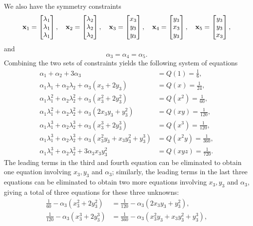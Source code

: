 \documentclass{homework}
\begin{document}
\begin{alphaparts}
		We also have the symmetry constraints
		\begin{equation*}
			\mathbf{x}_1 = \left[\begin{matrix}\lambda_1 \\\lambda_1\\\lambda_1\end{matrix}\right], \quad \mathbf{x}_2 = \left[\begin{matrix}\lambda_2\\\lambda_2\\\lambda_2\end{matrix}\right], \quad \mathbf{x}_3 = \left[\begin{matrix}x_3 \\ y_3 \\ y_3\end{matrix}\right], \quad \mathbf{x}_4 = \left[\begin{matrix}y_3\\x_3\\y_3\end{matrix}\right], \quad \mathbf{x}_5 = \left[\begin{matrix}y_3\\y_3\\x_3\end{matrix}\right],
		\end{equation*}
		and
		\begin{equation*}
			\alpha_3 = \alpha_4=\alpha_5.
		\end{equation*}
		Combining the two sets of constraints yields the following system of equations
		\begin{align*}
			\alpha_1 + \alpha_2 + 3\alpha_3 &= Q(1) = \frac{1}{6},\\
			\alpha_1\lambda_1 + \alpha_2\lambda_2 + \alpha_3(x_3 + 2y_3) &= Q(x) = \frac{1}{24}, \\
			\alpha_1\lambda_1^2 + \alpha_2\lambda_2^2 + \alpha_3(x_3^2 + 2y_3^2) &= Q(x^2) = \frac{1}{60}, \\
			\alpha_1\lambda_1^2 + \alpha_2\lambda_2^2 + \alpha_3(2x_3y_3 + y_3^2) &= Q(xy) = \frac{1}{120}, \\
			\alpha_1\lambda_1^3 + \alpha_2\lambda_2^3 + \alpha_3(x_3^3 + 2y_3^3) &= Q(x^3) = \frac{1}{120}, \\
			\alpha_1\lambda_1^3 + \alpha_2\lambda_2^3 + \alpha_3(x_3^2y_3 + x_3y_3^2 + y_3^3) &= Q(x^2y) = \frac{1}{360}, \\ 
			\alpha_1\lambda_1^3 + \alpha_2\lambda_2^3 + 3\alpha_3x_3y_3^2 &= Q(xyz) = \frac{1}{720}.
		\end{align*}
		The leading terms in the third and fourth equation can be eliminated to obtain one equation involving $x_3,y_3$ and $\alpha_3$; similarly, the leading terms in the last three equations can be eliminated to obtain two more equations involving $x_3,y_3$ and $\alpha_3$, giving a total of three equations for these three unknowns:
		\begin{align*}
			\frac{1}{60} - \alpha_3(x_3^2+2y_3^2) &= \frac{1}{120} - \alpha_3(2x_3y_3+y_3^2), \\
			\frac{1}{120} - \alpha_3(x_3^3+2y_3^3) &= \frac{1}{360} - \alpha_3(x_3^2y_3 + x_3y_3^2 + y_3^3), \\

\end{align*}
\end{alphaparts}
\end{document}
